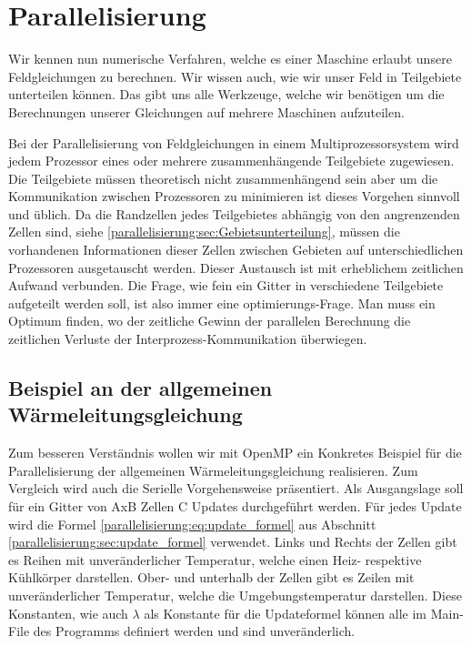%
%
%
%
\section{Parallelisierung
	\label{parallelisierung:sec:Parallelisierung}}
Wir kennen nun numerische Verfahren, welche es einer Maschine erlaubt unsere Feldgleichungen zu berechnen.
Wir wissen auch, wie wir unser Feld in Teilgebiete unterteilen können.
Das gibt uns alle Werkzeuge, welche wir benötigen um die Berechnungen unserer Gleichungen auf mehrere Maschinen aufzuteilen.

Bei der Parallelisierung von Feldgleichungen in einem Multiprozessorsystem wird jedem Prozessor eines oder mehrere zusammenhängende Teilgebiete zugewiesen.
Die Teilgebiete müssen theoretisch nicht zusammenhängend sein aber um die Kommunikation zwischen Prozessoren zu minimieren ist dieses Vorgehen sinnvoll und üblich.
Da die Randzellen jedes Teilgebietes abhängig von den angrenzenden Zellen sind, siehe \ref{parallelisierung:sec:Gebietsunterteilung}, müssen die vorhandenen Informationen dieser Zellen zwischen Gebieten auf unterschiedlichen Prozessoren ausgetauscht werden.
Dieser Austausch ist mit erheblichem zeitlichen Aufwand verbunden.
Die Frage, wie fein ein Gitter in verschiedene Teilgebiete aufgeteilt werden soll, ist also immer eine optimierungs-Frage.
Man muss ein Optimum finden, wo der zeitliche Gewinn der parallelen Berechnung die zeitlichen Verluste der Interprozess-Kommunikation überwiegen.




\subsection{Beispiel an der allgemeinen Wärmeleitungsgleichung
	\label{parallelisierung:sub:BeispielParallelisierung}}
Zum besseren Verständnis wollen wir mit OpenMP ein Konkretes Beispiel für die Parallelisierung der allgemeinen Wärmeleitungsgleichung realisieren.
Zum Vergleich wird auch die Serielle Vorgehensweise präsentiert.
Als Ausgangslage soll für ein Gitter von AxB Zellen C Updates durchgeführt werden.
Für jedes Update wird die Formel \ref{parallelisierung:eq:update_formel} aus Abschnitt \ref{parallelisierung:sec:update_formel} verwendet.
Links und Rechts der Zellen gibt es Reihen mit unveränderlicher Temperatur, welche einen Heiz- respektive Kühlkörper darstellen.
Ober- und unterhalb der Zellen gibt es Zeilen mit unveränderlicher Temperatur, welche die Umgebungstemperatur darstellen.
Diese Konstanten, wie auch $\lambda$ als Konstante für die Updateformel können alle im Main-File des Programms definiert werden und sind unveränderlich.

